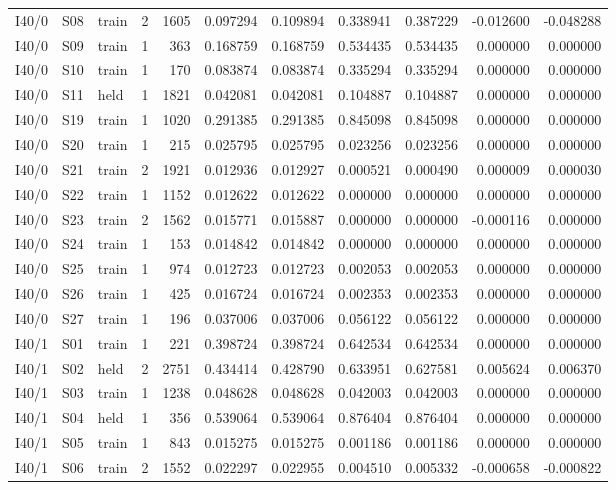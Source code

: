 \documentclass[10pt,a4paper]{article}
\begin{document}
{{\begin{longtable}{@{}lllrrrrrrrr@{}}
I40/0 & S08 & train & 2 & 1605 & 0.097294 & 0.109894 & 0.338941 & 0.387229 & -0.012600 & -0.048288 \\
I40/0 & S09 & train & 1 & 363 & 0.168759 & 0.168759 & 0.534435 & 0.534435 & 0.000000 & 0.000000 \\
I40/0 & S10 & train & 1 & 170 & 0.083874 & 0.083874 & 0.335294 & 0.335294 & 0.000000 & 0.000000 \\
I40/0 & S11 & held & 1 & 1821 & 0.042081 & 0.042081 & 0.104887 & 0.104887 & 0.000000 & 0.000000 \\
I40/0 & S19 & train & 1 & 1020 & 0.291385 & 0.291385 & 0.845098 & 0.845098 & 0.000000 & 0.000000 \\
I40/0 & S20 & train & 1 & 215 & 0.025795 & 0.025795 & 0.023256 & 0.023256 & 0.000000 & 0.000000 \\
I40/0 & S21 & train & 2 & 1921 & 0.012936 & 0.012927 & 0.000521 & 0.000490 & 0.000009 & 0.000030 \\
I40/0 & S22 & train & 1 & 1152 & 0.012622 & 0.012622 & 0.000000 & 0.000000 & 0.000000 & 0.000000 \\
I40/0 & S23 & train & 2 & 1562 & 0.015771 & 0.015887 & 0.000000 & 0.000000 & -0.000116 & 0.000000 \\
I40/0 & S24 & train & 1 & 153 & 0.014842 & 0.014842 & 0.000000 & 0.000000 & 0.000000 & 0.000000 \\
I40/0 & S25 & train & 1 & 974 & 0.012723 & 0.012723 & 0.002053 & 0.002053 & 0.000000 & 0.000000 \\
I40/0 & S26 & train & 1 & 425 & 0.016724 & 0.016724 & 0.002353 & 0.002353 & 0.000000 & 0.000000 \\
I40/0 & S27 & train & 1 & 196 & 0.037006 & 0.037006 & 0.056122 & 0.056122 & 0.000000 & 0.000000 \\
I40/1 & S01 & train & 1 & 221 & 0.398724 & 0.398724 & 0.642534 & 0.642534 & 0.000000 & 0.000000 \\
I40/1 & S02 & held & 2 & 2751 & 0.434414 & 0.428790 & 0.633951 & 0.627581 & 0.005624 & 0.006370 \\
I40/1 & S03 & train & 1 & 1238 & 0.048628 & 0.048628 & 0.042003 & 0.042003 & 0.000000 & 0.000000 \\
I40/1 & S04 & held & 1 & 356 & 0.539064 & 0.539064 & 0.876404 & 0.876404 & 0.000000 & 0.000000 \\
I40/1 & S05 & train & 1 & 843 & 0.015275 & 0.015275 & 0.001186 & 0.001186 & 0.000000 & 0.000000 \\
I40/1 & S06 & train & 2 & 1552 & 0.022297 & 0.022955 & 0.004510 & 0.005332 & -0.000658 & -0.000822 \\

\end{longtable}}}
\end{document}
